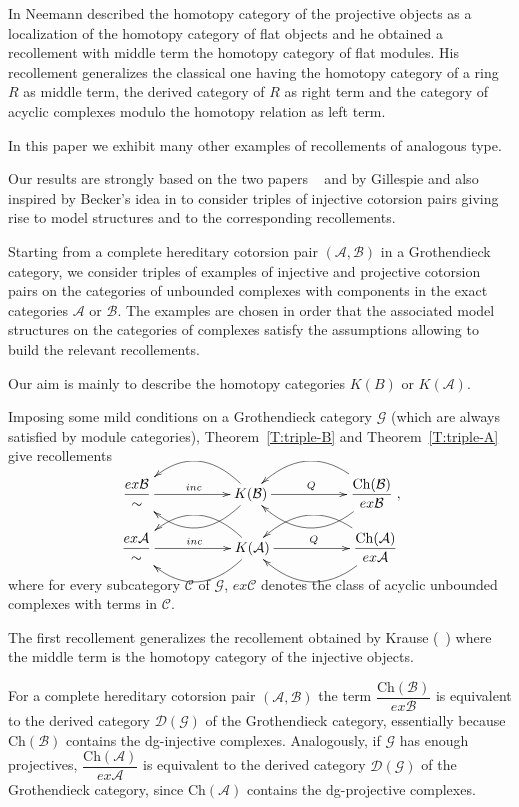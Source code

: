 \documentclass[11pt,a4paper,reqno]{amsart}
\newcommand{\A}{\mathcal{A}}
\newcommand{\B}{\mathcal{B}}
\newcommand{\C}{\mathcal{C}}
\newcommand{\D}{\mathcal{D}}
\newcommand{\G}{\mathcal{G}}
\newcommand{\Ch}{\mathrm{Ch}}
\theoremstyle{plain}
\theoremstyle{definition}
\theoremstyle{remark}
\begin{document}
In \cite{Nee08} Neemann described the homotopy category of the projective objects as a localization of the homotopy category of flat objects and he obtained a recollement  with middle  term the homotopy category of flat modules. His recollement generalizes the classical one having the homotopy category of a ring $R$ as middle term, the derived category of $R$ as right term and the category of acyclic complexes modulo the homotopy relation as left term.


In this paper we exhibit many other examples of recollements of analogous type.

Our results are strongly based on the two papers ~\cite{G6} and \cite{G7} by Gillespie and also inspired by Becker's idea in \cite{Beck12} to consider triples of injective cotorsion pairs giving rise to model structures and to the corresponding recollements.


Starting from a complete hereditary cotorsion pair $(\A, \B)$ in a Grothendieck category, we consider triples of examples of injective and projective cotorsion pairs on the categories of unbounded complexes with components in the exact categories $\A$ or $\B$.
The examples are chosen in order that the associated model structures on the categories of complexes satisfy the assumptions allowing to build the relevant recollements.

Our aim is mainly to describe the homotopy categories $K(B)$ or $K(\A)$.

Imposing some mild conditions on a Grothendieck category $\G$ (which are always satisfied by module categories), Theorem~\ref{T:triple-B} and Theorem~\ref{T:triple-A} give recollements
\vskip0.7cm
\[
\xymatrix{\dfrac{ex\B}{\sim} \ar[rr]^{inc} &&{K(\B)} \ar@/^2pc/[ll]\ar@/_2pc/[ll] \ar[rr]^{Q}
&&{\dfrac{\Ch(\B)}{ex\B }}\ar@/^2pc/ [ll] \ar@/_2pc/ [ll] }
,\]
\vskip0.7cm

\[
\xymatrix{\dfrac{ex\A}{\sim} \ar[rr]^{inc} &&{K(\A)} \ar@/^2pc/[ll]\ar@/_2pc/[ll] \ar[rr]^{Q}
&&{\dfrac{\Ch(\A)}{ex\A }}\ar@/^2pc/ [ll] \ar@/_2pc/ [ll] }
\]
\vskip0.7cm
 where for every subcategory $\C$ of $\G$, $ex{\C}$ denotes the class of acyclic unbounded complexes with terms in $\C$.

 The first recollement  generalizes the recollement obtained by Krause (~\cite{Kr05}) where the middle term is the homotopy category of the injective objects.


For a complete hereditary cotorsion pair $(\A, \B)$ the term $\dfrac{\Ch(\B)}{ex\B }$ is equivalent to the derived category $\D(\G)$ of the Grothendieck category, essentially because $\Ch(\B)$ contains the dg-injective complexes. Analogously, if $\G$ has enough projectives, $\dfrac{\Ch(\A)}{ex\A}$ is equivalent to the derived category $\D(\G)$ of the Grothendieck category, since $\Ch(\A)$ contains the dg-projective complexes.
\end{document}
